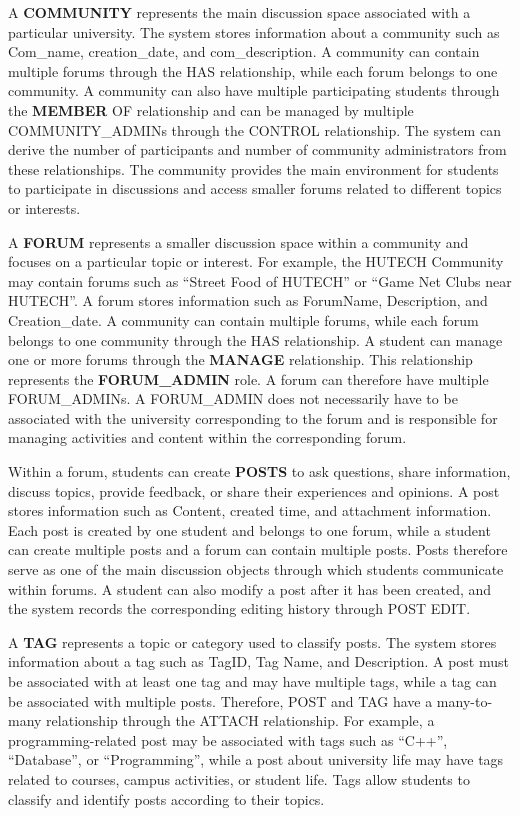 A \textbf{COMMUNITY} represents the main discussion space associated with a particular university. The system stores information about a community such as Com\_name, creation\_date, and com\_description. A community can contain multiple forums through the HAS relationship, while each forum belongs to one community. A community can also have multiple participating students through the \textbf{MEMBER} OF relationship and can be managed by multiple COMMUNITY\_ADMINs through the CONTROL relationship. The system can derive the number of participants and number of community administrators from these relationships. The community provides the main environment for students to participate in discussions and access smaller forums related to different topics or interests.

A \textbf{FORUM} represents a smaller discussion space within a community and focuses on a particular topic or interest. For example, the HUTECH Community may contain forums such as “Street Food of HUTECH” or “Game Net Clubs near HUTECH”. A forum stores information such as ForumName, Description, and Creation\_date. A community can contain multiple forums, while each forum belongs to one community through the HAS relationship. A student can manage one or more forums through the \textbf{MANAGE} relationship. This relationship represents the \textbf{FORUM\_ADMIN} role. A forum can therefore have multiple FORUM\_ADMINs. A FORUM\_ADMIN does not necessarily have to be associated with the university corresponding to the forum and is responsible for managing activities and content within the corresponding forum.

Within a forum, students can create \textbf{POSTS} to ask questions, share information, discuss topics, provide feedback, or share their experiences and opinions. A post stores information such as Content, created time, and attachment information. Each post is created by one student and belongs to one forum, while a student can create multiple posts and a forum can contain multiple posts. Posts therefore serve as one of the main discussion objects through which students communicate within forums. A student can also modify a post after it has been created, and the system records the corresponding editing history through POST EDIT.

A \textbf{TAG} represents a topic or category used to classify posts. The system stores information about a tag such as TagID, Tag Name, and Description. A post must be associated with at least one tag and may have multiple tags, while a tag can be associated with multiple posts. Therefore, POST and TAG have a many-to-many relationship through the ATTACH relationship. For example, a programming-related post may be associated with tags such as “C++”, “Database”, or “Programming”, while a post about university life may have tags related to courses, campus activities, or student life. Tags allow students to classify and identify posts according to their topics.

